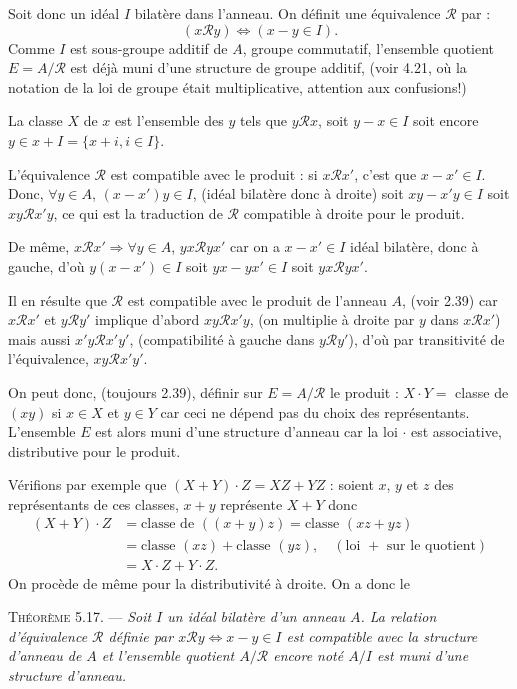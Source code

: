 Soit donc un idéal $I$ bilatère dans l'anneau. On définit une équivalence $\mathcal R$ par :
\[
(x\mathcal R y)\Longleftrightarrow(x-y\in I).
\]
Comme $I$ est sous-groupe additif de $A$, groupe commutatif, l'ensemble quotient $E=A/\mathcal R$ est déjà muni d'une structure de groupe additif, (voir 4.21, où la notation de la loi de groupe était multiplicative, attention aux confusions!)

La classe $X$ de $x$ est l'ensemble des $y$ tels que $y\mathcal R x$, soit $y-x\in I$ soit encore $y\in x+I=\{x+i,i\in I\}$.

L'équivalence $\mathcal R$ est compatible avec le produit : si $x\mathcal R x'$, c'est que $x-x'\in I$. Donc, $\forall y\in A$, $(x-x')y\in I$, (idéal bilatère donc à droite) soit $xy-x'y\in I$ soit $xy\mathcal R x'y$, ce qui est la traduction de $\mathcal R$ compatible à droite pour le produit.

De même, $x\mathcal R x'\Rightarrow\forall y\in A$, $yx\mathcal R yx'$ car on a $x-x'\in I$ idéal bilatère, donc à gauche, d'où $y(x-x')\in I$ soit $yx-yx'\in I$ soit $yx\mathcal R yx'$.

Il en résulte que $\mathcal R$ est compatible avec le produit de l'anneau $A$, (voir 2.39) car $x\mathcal R x'$ et $y\mathcal R y'$ implique d'abord $xy\mathcal R x'y$, (on multiplie à droite par $y$ dans $x\mathcal R x'$) mais aussi $x'y\mathcal R x'y'$, (compatibilité à gauche dans $y\mathcal R y'$), d'où par transitivité de l'équivalence, $xy\mathcal R x'y'$.

On peut donc, (toujours 2.39), définir sur $E=A/\mathcal R$ le produit : $X\cdot Y=$ classe de $(xy)$ si $x\in X$ et $y\in Y$ car ceci ne dépend pas du choix des représentants. L'ensemble $E$ est alors muni d'une structure d'anneau car la loi $\cdot$ est associative, distributive pour le produit.

Vérifions par exemple que $(X+Y)\cdot Z=XZ+YZ$ : soient $x$, $y$ et $z$ des représentants de ces classes, $x+y$ représente $X+Y$ donc
\begin{align*}
(X+Y)\cdot Z&=\text{classe de }((x+y)z)=\text{classe }(xz+yz)\\
&=\text{classe }(xz)+\text{classe }(yz),\quad(\text{loi $+$ sur le quotient})\\
&=X\cdot Z+Y\cdot Z.
\end{align*}
On procède de même pour la distributivité à droite. On a donc le

\medskip\noindent\textsc{Théorème 5.17.} --- \emph{Soit $I$ un idéal bilatère d'un anneau $A$. La relation d'équivalence $\mathcal R$ définie par $x\mathcal R y\Longleftrightarrow x-y\in I$ est compatible avec la structure d'anneau de $A$ et l'ensemble quotient $A/\mathcal R$ encore noté $A/I$ est muni d'une structure d'anneau.} \bookend

